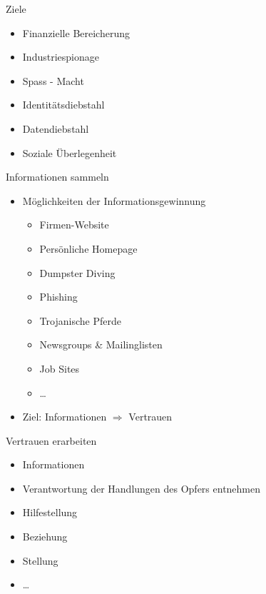 \documentclass[11pt]{beamer}
\begin{document}
\begin{frame}{Ziele}
  \begin{itemize}
    \item Finanzielle Bereicherung
    \item Industriespionage
    \item Spass - Macht
    \item Identitätsdiebstahl
    \item Datendiebstahl
    \item Soziale Überlegenheit
  \end{itemize}
\end{frame}

\begin{frame}{Informationen sammeln}
  \begin{itemize}
    \item Möglichkeiten der Informationsgewinnung
      \begin{itemize}
      \item Firmen-Website
      \item Persönliche Homepage
      \item Dumpster Diving
      \item Phishing
      \item Trojanische Pferde
      \item Newsgroups \& Mailinglisten
      \item Job Sites
      \item \dots
      \end{itemize}
    \item Ziel: Informationen $\Rightarrow$ Vertrauen
  \end{itemize}
\end{frame}

\begin{frame}{Vertrauen erarbeiten}
  \begin{itemize}
    \item Informationen
    \item Verantwortung der Handlungen des Opfers entnehmen
    \item Hilfestellung
    \item Beziehung
    \item Stellung
    \item \dots
  \end{itemize}
\end{frame}
\end{document}
